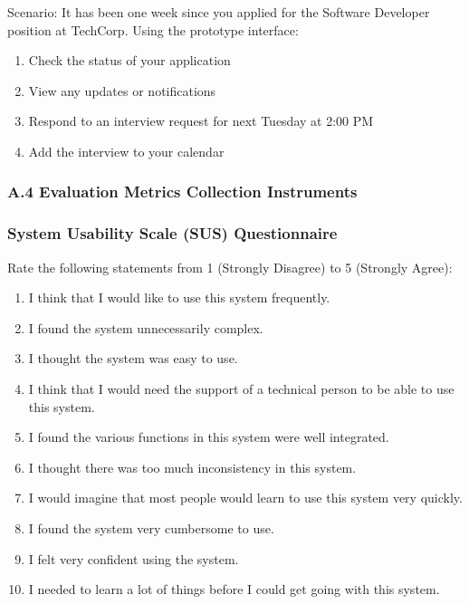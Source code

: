 \documentclass[
	letterpaper, %
]{jdf}
\begin{document}
\begin{sloppypar}

Scenario: It has been one week since you applied for the Software Developer position at TechCorp. Using the prototype interface:

\begin{enumerate}
    \item Check the status of your application
    \item View any updates or notifications
    \item Respond to an interview request for next Tuesday at 2:00 PM
    \item Add the interview to your calendar
\end{enumerate}

\subsubsection{A.4 Evaluation Metrics Collection Instruments}

\subsubsection{System Usability Scale (SUS) Questionnaire}

Rate the following statements from 1 (Strongly Disagree) to 5 (Strongly Agree):

\begin{enumerate}
    \item I think that I would like to use this system frequently.
    \item I found the system unnecessarily complex.
    \item I thought the system was easy to use.
    \item I think that I would need the support of a technical person to be able to use this system.
    \item I found the various functions in this system were well integrated.
    \item I thought there was too much inconsistency in this system.
    \item I would imagine that most people would learn to use this system very quickly.
    \item I found the system very cumbersome to use.
    \item I felt very confident using the system.
    \item I needed to learn a lot of things before I could get going with this system.
\end{enumerate}


\end{sloppypar}
\end{document}
